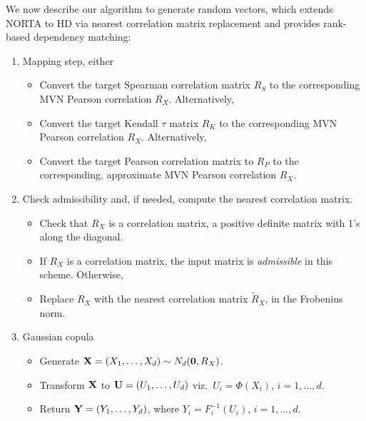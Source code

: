 \documentclass[
]{jss}
\providecommand{\tightlist}{%
  \setlength{\itemsep}{0pt}\setlength{\parskip}{0pt}}
\begin{document}
We now describe our algorithm to generate random vectors, which extends
NORTA to HD via nearest correlation matrix replacement and provides
rank-based dependency matching:


\begin{enumerate}
\def\labelenumi{\arabic{enumi}.}
\tightlist
\item
  Mapping step, either

  \begin{itemize}
  \tightlist
  \item
    Convert the target Spearman correlation matrix \(R_S\) to the
    corresponding MVN Pearson correlation \(R_X\). Alternatively,
  \item
    Convert the target Kendall \(\tau\) matrix \(R_K\) to the
    corresponding MVN Pearson correlation \(R_X\). Alternatively,
  \item
    Convert the target Pearson correlation matrix to \(R_P\) to the
    corresponding, approximate MVN Pearson correlation \(R_X\).
  \end{itemize}
\item
  Check admissibility and, if needed, compute the nearest correlation
  matrix.

  \begin{itemize}
  \tightlist
  \item
    Check that \(R_X\) is a correlation matrix, a positive definite
    matrix with 1's along the diagonal.
  \item
    If \(R_X\) is a correlation matrix, the input matrix is
    \emph{admissible} in this scheme. Otherwise,
  \item
    Replace \(R_X\) with the nearest correlation matrix \(\tilde{R}_X\),
    in the Frobenius norm.
  \end{itemize}
\item
  Gaussian copula

  \begin{itemize}
  \tightlist
  \item
    Generate \({\bf X}=(X_1, \ldots, X_d) \sim N_d({\bf 0}, R_X)\).
  \item
    Transform \({\bf X}\) to \({\bf U} = (U_1, \ldots, U_d)\)
    viz.~\(U_i=\Phi(X_i)\), \(i=1, \ldots, d\).
  \item
    Return \({\bf Y} = (Y_1, \ldots, Y_d)\), where
    \(Y_i=F_i^{-1}(U_i)\), \(i=1, \ldots, d\).
  \end{itemize}
\end{enumerate}
\end{document}
